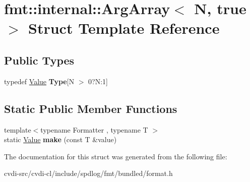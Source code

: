 \hypertarget{structfmt_1_1internal_1_1ArgArray_3_01N_00_01true_01_4}{}\section{fmt\+:\+:internal\+:\+:Arg\+Array$<$ N, true $>$ Struct Template Reference}
\label{structfmt_1_1internal_1_1ArgArray_3_01N_00_01true_01_4}
\subsection*{Public Types}
\begin{DoxyCompactItemize}
\item 
typedef \hyperlink{structfmt_1_1internal_1_1Value}{Value} {\bfseries Type}\mbox{[}N $>$ 0?N\+:1\mbox{]}\hypertarget{structfmt_1_1internal_1_1ArgArray_3_01N_00_01true_01_4_aeb168342e5c7353d8780f936d393c04f}{}\label{structfmt_1_1internal_1_1ArgArray_3_01N_00_01true_01_4_aeb168342e5c7353d8780f936d393c04f}

\end{DoxyCompactItemize}
\subsection*{Static Public Member Functions}
\begin{DoxyCompactItemize}
\item 
{\footnotesize template$<$typename Formatter , typename T $>$ }\\static \hyperlink{structfmt_1_1internal_1_1Value}{Value} {\bfseries make} (const T \&value)\hypertarget{structfmt_1_1internal_1_1ArgArray_3_01N_00_01true_01_4_a3977c938e1ca5c4c5aedccd85561a76d}{}\label{structfmt_1_1internal_1_1ArgArray_3_01N_00_01true_01_4_a3977c938e1ca5c4c5aedccd85561a76d}

\end{DoxyCompactItemize}


The documentation for this struct was generated from the following file\+:\begin{DoxyCompactItemize}
\item 
cvdi-\/src/cvdi-\/cl/include/spdlog/fmt/bundled/format.\+h\end{DoxyCompactItemize}
